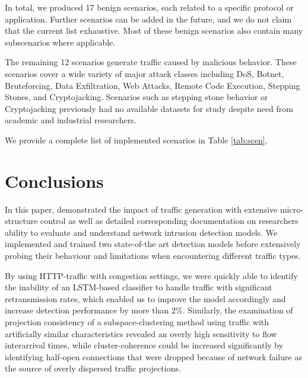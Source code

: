 \documentclass[runningheads]{llncs}
\begin{document}


In total, we produced 17 benign scenarios, each related to a specific protocol or application. Further scenarios can be added in the future, and we do not claim that the current list exhaustive. Most of these benign scenarios also contain many subscenarios where applicable.

The remaining 12 scenarios generate traffic caused by malicious behavior. These scenarios cover a wide variety of major attack classes including DoS, Botnet, Bruteforcing, Data Exfiltration, Web Attacks, Remote Code Execution, Stepping Stones, and Cryptojacking. 
Scenarios such as stepping stone behavior or Cryptojacking previously had no available datasets for study despite need from academic and industrial researchers.


We provide a complete list of implemented scenarios in Table \ref{tab:scen}.




\section{Conclusions}\label{Sec:Conclusion}

In this paper, demonstrated the impact of traffic generation with extensive micro-structure control as well as detailed corresponding documentation on researchers ability to evaluate and understand network intrusion detection models. We implemented and trained two state-of-the art detection models before extensively probing their behaviour and limitations when encountering different traffic types. 

By using HTTP-traffic with congestion settings, we were quickly able to identify the inability of an LSTM-based classifier to handle traffic with significant retransmission rates, which enabled us to improve the model accordingly and increase detection performance by more than $2\%$. Similarly, the examination of projection consistency of a subspace-clustering method using traffic with artificially similar characteristics revealed an overly high sensitivity to flow interarrival times, while cluster-coherence could be increased significantly by identifying half-open connections that were dropped because of network failure as the source of overly dispersed traffic projections. 
\end{document}
